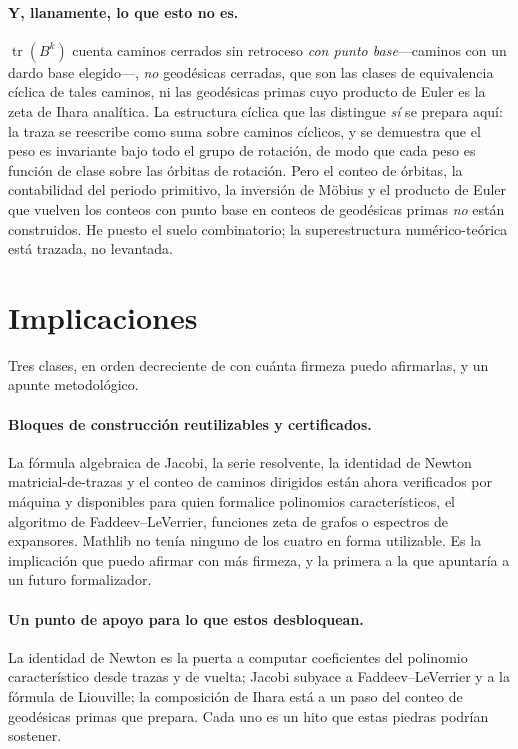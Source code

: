 \documentclass[11pt]{article}
\newcommand{\tr}{\operatorname{tr}}
\begin{document}
\paragraph{Y, llanamente, lo que esto no es.}
$\tr(B^k)$ cuenta caminos cerrados sin retroceso \emph{con punto base}---caminos con un dardo base
elegido---, \emph{no} geod\'esicas cerradas, que son las clases de equivalencia c\'iclica de tales
caminos, ni las geod\'esicas primas cuyo producto de Euler es la zeta de Ihara anal\'itica. La
estructura c\'iclica que las distingue \emph{s\'i} se prepara aqu\'i: la traza se reescribe como suma
sobre caminos c\'iclicos, y se demuestra que el peso es invariante bajo todo el grupo de rotaci\'on,
de modo que cada peso es funci\'on de clase sobre las \'orbitas de rotaci\'on. Pero el conteo de
\'orbitas, la contabilidad del periodo primitivo, la inversi\'on de M\"obius y el producto de Euler
que vuelven los conteos con punto base en conteos de geod\'esicas primas \emph{no} est\'an construidos.
He puesto el suelo combinatorio; la superestructura num\'erico-te\'orica est\'a trazada, no levantada.

\section{Implicaciones}
\label{sec:implications}

Tres clases, en orden decreciente de con cu\'anta firmeza puedo afirmarlas, y un apunte
metodol\'ogico.

\paragraph{Bloques de construcci\'on reutilizables y certificados.}
La f\'ormula algebraica de Jacobi, la serie resolvente, la identidad de Newton matricial-de-trazas y
el conteo de caminos dirigidos est\'an ahora verificados por m\'aquina y disponibles para quien
formalice polinomios caracter\'isticos, el algoritmo de Faddeev--LeVerrier, funciones zeta de grafos o
espectros de expansores. Mathlib no ten\'ia ninguno de los cuatro en forma utilizable. Es la
implicaci\'on que puedo afirmar con m\'as firmeza, y la primera a la que apuntar\'ia a un futuro
formalizador.

\paragraph{Un punto de apoyo para lo que estos desbloquean.}
La identidad de Newton es la puerta a computar coeficientes del polinomio caracter\'istico desde
trazas y de vuelta; Jacobi subyace a Faddeev--LeVerrier y a la f\'ormula de Liouville; la composici\'on
de Ihara est\'a a un paso del conteo de geod\'esicas primas que prepara. Cada uno es un hito que estas
piedras podr\'ian sostener.
\end{document}
